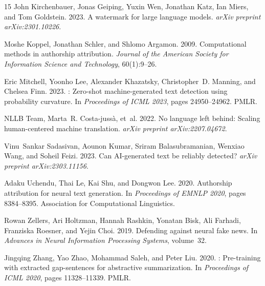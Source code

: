 \documentclass[11pt]{article}
\begin{document}
\begin{thebibliography}{15}
John Kirchenbauer, Jonas Geiping, Yuxin Wen, Jonathan Katz, Ian Miers, and
  Tom Goldstein. 2023.
\newblock A watermark for large language models.
\newblock \emph{arXiv preprint arXiv:2301.10226}.

Moshe Koppel, Jonathan Schler, and Shlomo Argamon. 2009.
\newblock Computational methods in authorship attribution.
\newblock \emph{Journal of the American Society for Information Science and
  Technology}, 60(1):9--26.

Eric Mitchell, Yoonho Lee, Alexander Khazatsky, Christopher~D. Manning, and
  Chelsea Finn. 2023.
: Zero-shot machine-generated text detection using
  probability curvature.
\newblock In \emph{Proceedings of ICML 2023}, pages 24950--24962. PMLR.

{NLLB Team}, Marta~R. Costa-juss{\`a}, et~al. 2022.
\newblock No language left behind: Scaling human-centered machine translation.
\newblock \emph{arXiv preprint arXiv:2207.04672}.

Vinu~Sankar Sadasivan, Aounon Kumar, Sriram Balasubramanian, Wenxiao Wang,
  and Soheil Feizi. 2023.
\newblock Can {AI}-generated text be reliably detected?
\newblock \emph{arXiv preprint arXiv:2303.11156}.

Adaku Uchendu, Thai Le, Kai Shu, and Dongwon Lee. 2020.
\newblock Authorship attribution for neural text generation.
\newblock In \emph{Proceedings of EMNLP 2020}, pages 8384--8395. Association
  for Computational Linguistics.

Rowan Zellers, Ari Holtzman, Hannah Rashkin, Yonatan Bisk, Ali Farhadi,
  Franziska Roesner, and Yejin Choi. 2019.
\newblock Defending against neural fake news.
\newblock In \emph{Advances in Neural Information Processing Systems},
  volume~32.

Jingqing Zhang, Yao Zhao, Mohammad Saleh, and Peter Liu. 2020.
: Pre-training with extracted gap-sentences for abstractive
  summarization.
\newblock In \emph{Proceedings of ICML 2020}, pages 11328--11339. PMLR.

\end{thebibliography}
\end{document}
